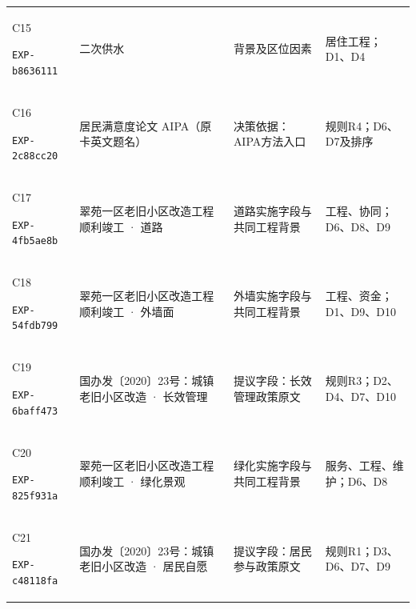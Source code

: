 {\begin{longtable}{@{}L{29mm}L{36mm}L{56mm}L{32mm}@{}}
\hypertarget{EXP-b8636111-04b9-40b3-9433-50e24dffe565}{C15}\newline\texttt{EXP-b8636111} & 二次供水 & 背景及区位因素 & 居住工程；D1、D4\\
\hypertarget{EXP-2c88cc20-e2d3-4a32-a176-e48d753a4712}{C16}\newline\texttt{EXP-2c88cc20} & 居民满意度论文 AIPA（原卡英文题名） & 决策依据：AIPA方法入口 & 规则R4；D6、D7及排序\\
\hypertarget{EXP-4fb5ae8b-4f8c-4b38-9f15-7fd612098a66}{C17}\newline\texttt{EXP-4fb5ae8b} & 翠苑一区老旧小区改造工程顺利竣工 · 道路 & 道路实施字段与共同工程背景 & 工程、协同；D6、D8、D9\\
\hypertarget{EXP-54fdb799-7504-45fd-bd7a-b619e98cf6cb}{C18}\newline\texttt{EXP-54fdb799} & 翠苑一区老旧小区改造工程顺利竣工 · 外墙面 & 外墙实施字段与共同工程背景 & 工程、资金；D1、D9、D10\\
\hypertarget{EXP-6baff473-93ed-4160-9a93-a0abf3c7b092}{C19}\newline\texttt{EXP-6baff473} & 国办发〔2020〕23号：城镇老旧小区改造 · 长效管理 & 提议字段：长效管理政策原文 & 规则R3；D2、D4、D7、D10\\
\hypertarget{EXP-825f931a-a8d3-49c2-9c42-e73bea9922e6}{C20}\newline\texttt{EXP-825f931a} & 翠苑一区老旧小区改造工程顺利竣工 · 绿化景观 & 绿化实施字段与共同工程背景 & 服务、工程、维护；D6、D8\\
\hypertarget{EXP-c48118fa-9af5-4f9a-a634-ae276701cc6a}{C21}\newline\texttt{EXP-c48118fa} & 国办发〔2020〕23号：城镇老旧小区改造 · 居民自愿 & 提议字段：居民参与政策原文 & 规则R1；D3、D6、D7、D9\\

\end{longtable}}
